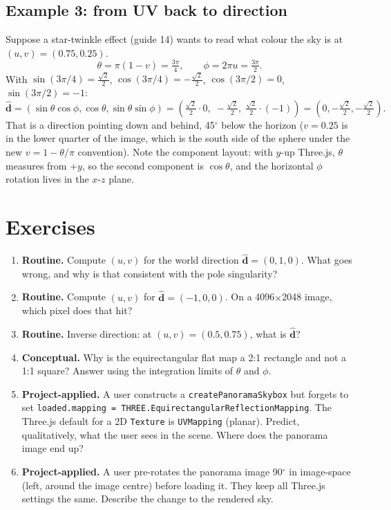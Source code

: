 \documentclass{article}
\begin{document}
\subsection*{Example 3: from UV back to direction}

Suppose a star-twinkle effect (guide 14) wants to read what colour the sky is
at $(u, v) = (0.75, 0.25)$.
\[
  \theta = \pi(1 - v) = \tfrac{3\pi}{4}, \qquad \phi = 2\pi u = \tfrac{3\pi}{2}.
\]
With $\sin(3\pi/4) = \tfrac{\sqrt{2}}{2}$, $\cos(3\pi/4) = -\tfrac{\sqrt{2}}{2}$,
$\cos(3\pi/2) = 0$, $\sin(3\pi/2) = -1$:
\[
  \hat{\mathbf{d}} = (\sin\theta \cos\phi, \cos\theta, \sin\theta \sin\phi)
                   = \!\left(\tfrac{\sqrt{2}}{2} \cdot 0, \; -\tfrac{\sqrt{2}}{2}, \; \tfrac{\sqrt{2}}{2} \cdot (-1)\right)
                   = (0, -\tfrac{\sqrt{2}}{2}, -\tfrac{\sqrt{2}}{2}).
\]
That is a direction pointing down and behind, 45$^\circ$ below the horizon
($v = 0.25$ is in the lower quarter of the image, which is the south side
of the sphere under the new $v = 1 - \theta/\pi$ convention). Note the
component layout: with $y$-up Three.js, $\theta$ measures from $+y$, so the
second component is $\cos\theta$, and the horizontal $\phi$ rotation lives
in the $x$-$z$ plane.

\section{Exercises}

\begin{enumerate}
  \item \textbf{Routine.} Compute $(u, v)$ for the world direction
        $\hat{\mathbf{d}} = (0, 1, 0)$. What goes wrong, and why is that
        consistent with the pole singularity?
  \item \textbf{Routine.} Compute $(u, v)$ for
        $\hat{\mathbf{d}} = (-1, 0, 0)$. On a 4096$\times$2048 image, which
        pixel does that hit?
  \item \textbf{Routine.} Inverse direction: at $(u, v) = (0.5, 0.75)$, what
        is $\hat{\mathbf{d}}$?
  \item \textbf{Conceptual.} Why is the equirectangular flat map a 2:1
        rectangle and not a 1:1 square? Answer using the integration limits
        of $\theta$ and $\phi$.
  \item \textbf{Project-applied.} A user constructs a
        \texttt{createPanoramaSkybox} but forgets to set
        \texttt{loaded.mapping = THREE.EquirectangularReflectionMapping}. The
        Three.js default for a 2D \texttt{Texture} is
        \texttt{UVMapping} (planar). Predict, qualitatively, what the user
        sees in the scene. Where does the panorama image end up?
  \item \textbf{Project-applied.} A user pre-rotates the panorama image
        90$^\circ$ in image-space (left, around the image centre) before
        loading it. They keep all Three.js settings the same. Describe the
        change to the rendered sky.
\end{enumerate}
\end{document}

